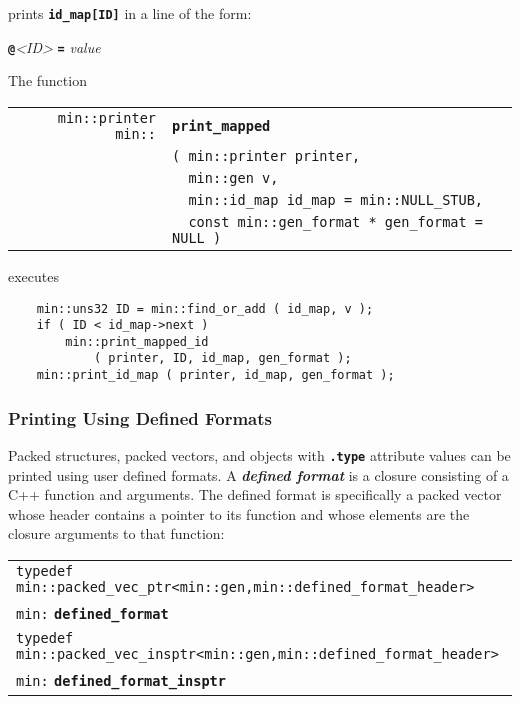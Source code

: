 \documentclass[12pt]{article}
\makeatletter
\newcommand{\TT}[1]{{\tt \bfseries #1}}
\newcommand{\key}[1]{{\bf \em #1}\index{#1}}
\newcommand{\ttindex}[1]{\index{#1@{\tt #1}}}
\newenvironment{indpar}[1][0.3in]%
	{\begin{list}{}%
		     {\setlength{\itemsep}{0in}%
		      \setlength{\topsep}{0in}%
		      \setlength{\parsep}{1ex}%
		      \setlength{\labelwidth}{#1}%
		      \setlength{\leftmargin}{#1}%
		      \addtolength{\leftmargin}{\labelsep}}%
	 \item}%
	{\end{list}}
\newcommand{\LABEL}[1]{\label{#1}}
\newlength{\ARGBREAKLENGTH}
\newcommand{\ARGBREAK}[1][\ARGBREAKLENGTH]{\\&\hspace*{#1}}
\newcommand{\MINKEY}[1]%
	   {\TT{#1}\ttindex{min::#1}\ttindex{#1}}
\makeatother
\begin{document}
prints \TT{id\_map[ID]} in a line of the form:
\begin{center}
\TT{@}{\em <ID>} \TT{=} {\em value}
\end{center}

The function

\begin{indpar}[1em]\begin{tabular}{r@{}l}
\verb|min::printer min::| & \MINKEY{print\_mapped}
\LABEL{MIN::PRINT_MAPPED}\ARGBREAK
    \verb|( min::printer printer,|\ARGBREAK
    \verb|  min::gen v,|\ARGBREAK
    \verb|  min::id_map id_map = min::NULL_STUB,|\ARGBREAK
    \verb|  const min::gen_format * gen_format = NULL )| \\
\end{tabular}\end{indpar}

executes

\begin{indpar}\begin{verbatim}
    min::uns32 ID = min::find_or_add ( id_map, v );
    if ( ID < id_map->next )
        min::print_mapped_id
            ( printer, ID, id_map, gen_format );
    min::print_id_map ( printer, id_map, gen_format );
\end{verbatim}\end{indpar}

\subsubsection{Printing Using Defined Formats}
\label{PRINTING-USING-DEFINED-FORMATS}

Packed structures, packed vectors, and objects with
\TT{.type} attribute values can be printed using user defined
formats.  A \key{defined format} is a closure consisting of
a C++ function and arguments.  The defined format is specifically
a packed vector whose header contains a pointer to its function
and whose elements are the closure arguments to that function:

\begin{indpar}[0.1in]\begin{tabular}{l}
\verb|typedef min::packed_vec_ptr<min::gen,min::defined_format_header>|\\
\hspace*{1in}\verb|min:| \MINKEY{defined\_format} \\
\verb|typedef min::packed_vec_insptr<min::gen,min::defined_format_header>|\\
\hspace*{1in}\verb|min:| \MINKEY{defined\_format\_insptr} \\
\end{tabular}\end{indpar}
\end{document}
